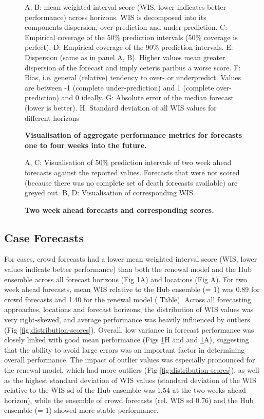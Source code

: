 \documentclass[10pt,letterpaper]{article}
\begin{document}
\begin{figure}[H]
\caption{\bf{Visualisation of aggregate performance metrics for forecasts one to four weeks into the future.}}
A, B: mean weighted interval score (WIS, lower indicates better performance) across horizons. WIS is decomposed into its components dispersion, over-prediction and under-prediction. C: Empirical coverage of the 50\% prediction intervals (50\% coverage is perfect). D: Empirical coverage of the 90\% prediction intervals. E: Dispersion (same as in panel A, B). Higher values mean greater dispersion of the forecast and imply ceteris paribus a worse score. F: Bias, i.e. general (relative) tendency to over- or underpredict. Values are between -1 (complete under-prediction) and 1 (complete over-prediction) and 0 ideally. G: Absolute error of the median forecast (lower is better). H. Standard deviation of all WIS values for different horizons
\label{fig:agg-performance-all}
\end{figure}

\begin{figure}[H]
\caption{\bf{Two week ahead forecasts and corresponding scores. }}
A, C: Visualisation of 50\% prediction intervals of two week ahead forecasts against the reported values. Forecasts that were not scored (because there was no complete set of death forecasts available) are greyed out. B, D: Visualisation of corresponding WIS.
\label{fig:forecasts-and-truth}
\end{figure}

\hypertarget{case-forecasts}{%
\subsection{Case Forecasts}\label{case-forecasts}}

For cases, crowd forecasts had a lower mean weighted interval score
(WIS, lower values indicate better performance) than both the renewal
model and the Hub ensemble across all forecast horizons (Fig
\ref{fig:agg-performance-all}A) and locations (Fig
A). For two week ahead forecasts,
mean WIS relative to the Hub ensemble (= 1) was 0.89 for crowd forecasts
and 1.40 for the renewal model ( Table).
Across all forecasting approaches, locations and forecast horizons, the
distribution of WIS values was very right-skewed, and average
performance was heavily influenced by outliers (Fig
\ref{fig:distribution-scores}). Overall, low variance in forecast
performance was closely linked with good mean performance (Figs
\ref{fig:agg-performance-all}H and and \ref{fig:agg-performance-all}A),
suggesting that the ability to avoid large errors was an important
factor in determining overall performance. The impact of outlier values
was especially pronounced for the renewal model, which had more outliers
(Fig \ref{fig:distribution-scores}), as well as the highest standard
deviation of WIS values (standard deviation of the WIS relative to the
WIS sd of the Hub ensemble was 1.54 at the two weeks ahead horizon),
while the ensemble of crowd forecasts (rel. WIS sd 0.76) and the Hub
ensemble (= 1) showed more stable performance.
\end{document}
